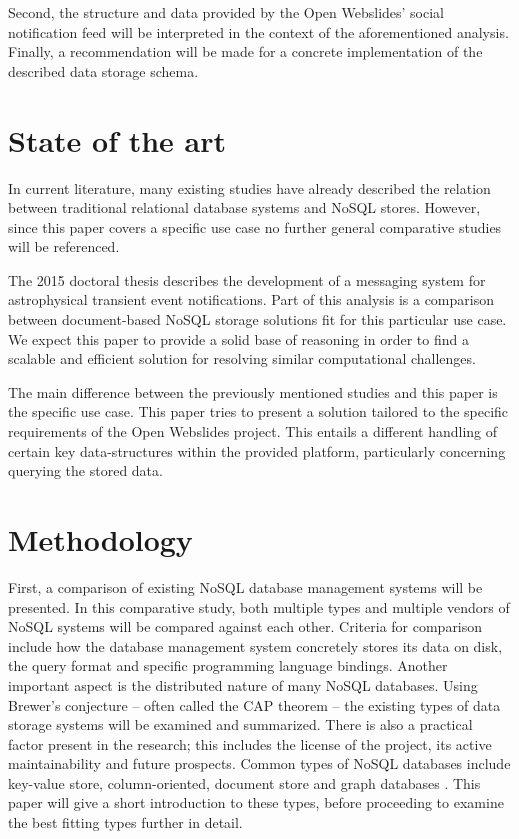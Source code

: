 \documentclass[fleqn,10pt]{voorstel}
\begin{document}
Second, the structure and data provided by the Open Webslides' social notification feed will be interpreted in the context of the aforementioned analysis. Finally, a recommendation will be made for a concrete implementation of the described data storage schema.


\section{State of the art}
\label{sec:state-of-the-art}

In current literature, many existing studies have already described the relation between traditional relational database systems and NoSQL stores. However, since this paper covers a specific use case no further general comparative studies will be referenced.

The 2015 doctoral thesis \autocite{Zhao2015} describes the development of a messaging system for astrophysical transient event notifications. Part of this analysis is a comparison between document-based NoSQL storage solutions fit for this particular use case. We expect this paper to provide a solid base of reasoning in order to find a scalable and efficient solution for resolving similar computational challenges.

The main difference between the previously mentioned studies and this paper is the specific use case. This paper tries to present a solution tailored to the specific requirements of the Open Webslides project. This entails a different handling of certain key data-structures within the provided platform, particularly concerning querying the stored data.


\section{Methodology}
\label{sec:methodology}

First, a comparison of existing NoSQL database management systems will be presented. In this comparative study, both multiple types and multiple vendors of NoSQL systems will be compared against each other. Criteria for comparison include how the database management system concretely stores its data on disk, the query format and specific programming language bindings. Another important aspect is the distributed nature of many NoSQL databases. Using Brewer's conjecture \autocite{Brewer2002} -- often called the CAP theorem -- the existing types of data storage systems will be examined and summarized. There is also a practical factor present in the research; this includes the license of the project, its active maintainability and future prospects.
Common types of NoSQL databases include key-value store, column-oriented, document store and graph databases \autocite{NayakPoriyaPoojary2003}. This paper will give a short introduction to these types, before proceeding to examine the best fitting types further in detail.
\end{document}
